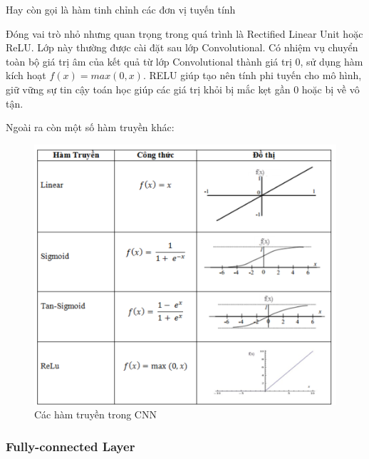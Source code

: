 Hay còn gọi là hàm tinh chỉnh các đơn vị tuyến tính

Đóng vai trò nhỏ nhưng quan trọng trong quá trình là Rectified Linear Unit hoặc ReLU. Lớp này thường được cài đặt sau lớp Convolutional. Có nhiệm vụ chuyển toàn bộ giá trị âm của kết quả từ lớp Convolutional thành giá trị 0, sử dụng hàm kích hoạt $ f(x) = max(0,x)$. RELU giúp tạo nên tính phi tuyến cho mô hình, giữ vững sự tin cậy toán học giúp các giá trị khỏi bị mắc kẹt gần 0 hoặc bị về vô tận.

Ngoài ra còn một số hàm truyền khác:
\begin{center}
    \begin{figure}[h!]
    \begin{center}
     \includegraphics[scale=1]{img/RELU.png}
    \end{center}
    \caption{Các hàm truyền trong CNN \cite{softmax} }
    \label{refhinh6}
    \end{figure}
\end{center}
\newpage
\subsubsection{Fully-connected Layer}

